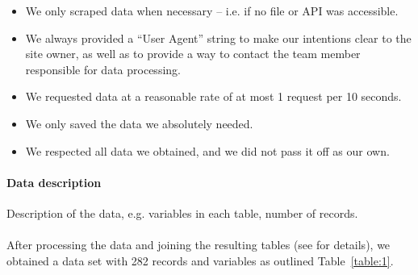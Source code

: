 \documentclass[11pt,a4paper]{article}
\begin{document}
\begin{itemize}
    \item We only scraped data when necessary – i.e. if no file or API was accessible.
    \item We always provided a “User Agent” string to make our intentions clear to the site owner, as well as to provide a way to contact the team member responsible for data processing.
    \item We requested data at a reasonable rate of at most 1 request per 10 seconds.
    \item We only saved the data we absolutely needed.
    \item We respected all data we obtained, and we did not pass it off as our own.
\end{itemize}

\paragraph{Data description} Description of the data, e.g. variables
in each table, number of records. \\ \\
After processing the data and joining the resulting tables (see  for details), we obtained a data set with 282 records and variables as outlined Table~\ref{table:1}.
\end{document}
